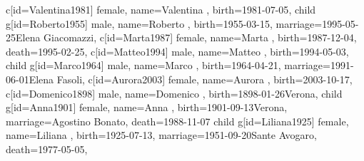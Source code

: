 \documentclass{article}
\begin{document}
\begin{midpage}
\begin{center}
\begin{genealogypicture}
{{{{{{{{                            }
                            c[id=Valentina1981]{
                                female,
                                name={Valentina },
                                birth={1981-07-05}{},
                            }
                        }
                        child{
                            g[id=Roberto1955]{
                                male,
                                name={Roberto },
                                birth={1955-03-15}{},
                                marriage={1995-05-25}{Elena Giacomazzi},
                            }
                            c[id=Marta1987]{
                                female,
                                name={Marta },
                                birth={1987-12-04}{},
                                death={1995-02-25}{},
                            }
                            c[id=Matteo1994]{
                                male,
                                name={Matteo },
                                birth={1994-05-03}{},
                            }
                        }
                        child{
                            g[id=Marco1964]{
                                male,
                                name={Marco },
                                birth={1964-04-21}{},
                                marriage={1991-06-01}{Elena Fasoli},
                            }
                            c[id=Aurora2003]{
                                female,
                                name={Aurora },
                                birth={2003-10-17}{},
                            }
                        }
                    }
                }
                c[id=Domenico1898]{
                    male,
                    name={Domenico },
                    birth={1898-01-26}{Verona},
                }
                child{
                    g[id=Anna1901]{
                        female,
                        name={Anna },
                        birth={1901-09-13}{Verona},
                        marriage={Agostino Bonato}{},
                        death={1988-11-07}{}
                    }
                    child{
                        g[id=Liliana1925]{
                            female,
                            name={Liliana },
                            birth={1925-07-13}{},
                            marriage={1951-09-20}{Sante Avogaro},
                            death={1977-05-05}{},
}}}}}}}
\end{genealogypicture}
\end{center}
\end{midpage}
\end{document}
